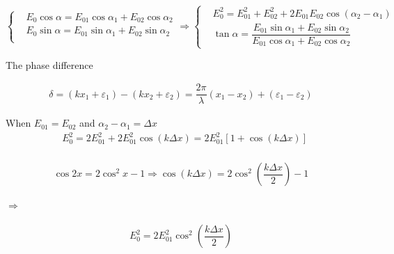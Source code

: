 \begin{equation*}
  \left\{
    \begin{aligned}
      & E_0 \cos \alpha = E_{01} \cos \alpha_1 + E_{02} \cos \alpha_2 \\
      & E_0 \sin \alpha = E_{01} \sin \alpha_1 + E_{02} \sin \alpha_2 \\
    \end{aligned}
  \right.
  \Rightarrow
  \left\{
    \begin{aligned}
      & E_0^2 = E_{01}^2 + E_{02}^2 + 2 E_{01} E_{02} \cos \left( \alpha_2 - \alpha_1 \right) \\
      & \tan \alpha = \dfrac{E_{01} \sin \alpha_1 + E_{02} \sin \alpha_2}{E_{01} \cos \alpha_1 + E_{02} \cos \alpha_2} 
    \end{aligned}
  \right.
\end{equation*}

The phase difference

\begin{equation*}
  \begin{aligned}
    \delta = \left( k x_1 + \varepsilon_1 \right) - \left( k x_2 + \varepsilon_2 \right) = \dfrac{2 \pi}{\lambda} \left( x_1 - x_2 \right) + \left( \varepsilon_1 - \varepsilon_2 \right)
  \end{aligned}
\end{equation*}

When $E_{01} = E_{02}$ and $\alpha_2 - \alpha_1 = \Delta x$
\begin{equation*}
  \begin{aligned}
      & E_0^2 = 2 E_{01}^2 + 2 E_{01}^2 \cos \left( k \Delta x \right) = 2 E_{01}^2 \left[ 1 + \cos \left( k \Delta x \right) \right] \\
  \end{aligned}
\end{equation*}

\begin{equation*}
  \begin{aligned}
    \cos 2x = 2 \cos^2 x - 1 \Rightarrow \cos \left( k \Delta x \right) = 2 \cos^2 \left( \dfrac{k \Delta x}{2}  \right) - 1
  \end{aligned}
\end{equation*}

$\Rightarrow$

\begin{equation*}
  \begin{aligned}
    E_0^2 = 2 E_{01}^2 \cos^2 \left( \dfrac{k \Delta x}{2}  \right)
  \end{aligned}
\end{equation*}

